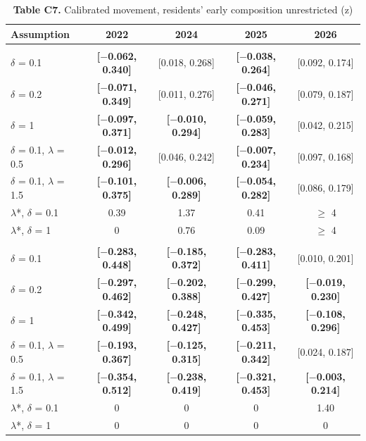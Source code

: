 \begin{table}[!htbp]
\centering
\scriptsize
\setlength{\tabcolsep}{3.5pt}
\caption*{\textbf{Table C7.} Calibrated movement, residents' early composition unrestricted (z)}
\begin{tabularx}{\linewidth}{lCCCC}
\toprule
Assumption & 2022 & 2024 & 2025 & 2026 \\
\midrule
\addlinespace[3pt] \\
$\delta $ = 0.1 & \textbf{[$-$0.062, 0.340]} & [0.018, 0.268] & \textbf{[$-$0.038, 0.264]} & [0.092, 0.174] \\
$\delta $ = 0.2 & \textbf{[$-$0.071, 0.349]} & [0.011, 0.276] & \textbf{[$-$0.046, 0.271]} & [0.079, 0.187] \\
$\delta $ = 1 & \textbf{[$-$0.097, 0.371]} & \textbf{[$-$0.010, 0.294]} & \textbf{[$-$0.059, 0.283]} & [0.042, 0.215] \\
$\delta $ = 0.1, $\lambda $ = 0.5 & \textbf{[$-$0.012, 0.296]} & [0.046, 0.242] & \textbf{[$-$0.007, 0.234]} & [0.097, 0.168] \\
$\delta $ = 0.1, $\lambda $ = 1.5 & \textbf{[$-$0.101, 0.375]} & \textbf{[$-$0.006, 0.289]} & \textbf{[$-$0.054, 0.282]} & [0.086, 0.179] \\
$\lambda $*, $\delta $ = 0.1 & 0.39 & 1.37 & 0.41 & $\geq $ 4 \\
$\lambda $*, $\delta $ = 1 & 0 & 0.76 & 0.09 & $\geq $ 4 \\
\addlinespace[3pt] \\
$\delta $ = 0.1 & \textbf{[$-$0.283, 0.448]} & \textbf{[$-$0.185, 0.372]} & \textbf{[$-$0.283, 0.411]} & [0.010, 0.201] \\
$\delta $ = 0.2 & \textbf{[$-$0.297, 0.462]} & \textbf{[$-$0.202, 0.388]} & \textbf{[$-$0.299, 0.427]} & \textbf{[$-$0.019, 0.230]} \\
$\delta $ = 1 & \textbf{[$-$0.342, 0.499]} & \textbf{[$-$0.248, 0.427]} & \textbf{[$-$0.335, 0.453]} & \textbf{[$-$0.108, 0.296]} \\
$\delta $ = 0.1, $\lambda $ = 0.5 & \textbf{[$-$0.193, 0.367]} & \textbf{[$-$0.125, 0.315]} & \textbf{[$-$0.211, 0.342]} & [0.024, 0.187] \\
$\delta $ = 0.1, $\lambda $ = 1.5 & \textbf{[$-$0.354, 0.512]} & \textbf{[$-$0.238, 0.419]} & \textbf{[$-$0.321, 0.453]} & \textbf{[$-$0.003, 0.214]} \\
$\lambda $*, $\delta $ = 0.1 & 0 & 0 & 0 & 1.40 \\
$\lambda $*, $\delta $ = 1 & 0 & 0 & 0 & 0 \\

\end{tabularx}
\end{table}
